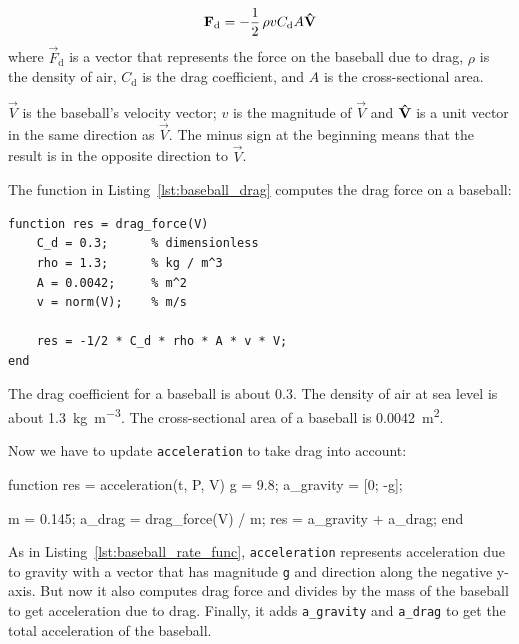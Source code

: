 \begin{equation*}
    \vec{F}_\mathrm{d} = - \frac{1}{2} \, \rho v C_\mathrm{d} A \uvec{V}
\end{equation*}
where $\vec{F}_\mathrm{d}$ is a vector that represents the force on the baseball
due to drag, 
$\rho$ is the density of air, 
$C_\mathrm{d}$ is the drag coefficient, and
$A$ is the cross-sectional area.


$\vec{V}$ is the baseball's velocity vector; $v$ is the magnitude of $\vec{V}$ and $\uvec{V}$ is a unit vector in the same direction as $\vec{V}$.  The minus sign at the beginning means that the result is in the opposite direction to $\vec{V}$.


The function in Listing~\ref{lst:baseball_drag} computes the drag force on a baseball:

\begin{lstlisting}[caption={A function that calculates the drag force on a baseball}, label={lst:baseball_drag}]
 function res = drag_force(V)
    C_d = 0.3;      % dimensionless
    rho = 1.3;      % kg / m^3
    A = 0.0042;     % m^2
    v = norm(V);    % m/s

    res = -1/2 * C_d * rho * A * v * V;
end
\end{lstlisting}
  
The drag coefficient for a baseball is about 0.3.  
The density of air at sea level is about \SI{1.3}{\kilogram\per\meter\cubed}.
The cross-sectional area of a baseball is \SI{0.0042}{\meter\squared}.


Now we have to update \lstinline{acceleration} to take drag into account:

\begin{code}
function res = acceleration(t, P, V)
    g = 9.8;                       %
    a_gravity = [0; -g];

    m = 0.145;                     %
    a_drag = drag_force(V) / m;
    res = a_gravity + a_drag;
end
\end{code}

As in Listing~\ref{lst:baseball_rate_func}, \lstinline{acceleration} represents acceleration due to gravity with a vector that has magnitude \lstinline{g} and direction along the negative y-axis.
But now it also computes drag force and divides by the mass of the baseball to get acceleration due to drag.
Finally, it adds \lstinline{a_gravity} and \lstinline{a_drag} to get the total acceleration of the baseball.

